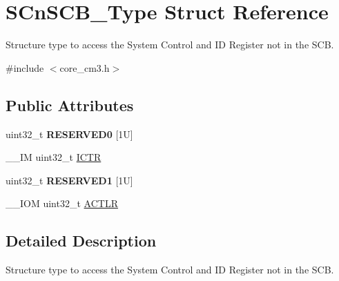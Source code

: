 \hypertarget{struct_s_cn_s_c_b___type}{\section{S\-Cn\-S\-C\-B\-\_\-\-Type Struct Reference}
\label{struct_s_cn_s_c_b___type}
}


Structure type to access the System Control and I\-D Register not in the S\-C\-B.  




{\ttfamily \#include $<$core\-\_\-cm3.\-h$>$}

\subsection*{Public Attributes}
\begin{DoxyCompactItemize}
\item 
\hypertarget{struct_s_cn_s_c_b___type_a758b3cae751b227e20698256b6249dd4}{uint32\-\_\-t {\bfseries R\-E\-S\-E\-R\-V\-E\-D0} \mbox{[}1\-U\mbox{]}}\label{struct_s_cn_s_c_b___type_a758b3cae751b227e20698256b6249dd4}

\item 
\-\_\-\-\_\-\-I\-M uint32\-\_\-t \hyperlink{struct_s_cn_s_c_b___type_a34ec1d771245eb9bd0e3ec9336949762}{I\-C\-T\-R}
\item 
\hypertarget{struct_s_cn_s_c_b___type_a0bce3f86e9f6e00085cf5a126ae201c6}{uint32\-\_\-t {\bfseries R\-E\-S\-E\-R\-V\-E\-D1} \mbox{[}1\-U\mbox{]}}\label{struct_s_cn_s_c_b___type_a0bce3f86e9f6e00085cf5a126ae201c6}

\item 
\-\_\-\-\_\-\-I\-O\-M uint32\-\_\-t \hyperlink{struct_s_cn_s_c_b___type_a13af9b718dde7481f1c0344f00593c23}{A\-C\-T\-L\-R}
\end{DoxyCompactItemize}


\subsection{Detailed Description}
Structure type to access the System Control and I\-D Register not in the S\-C\-B. 

